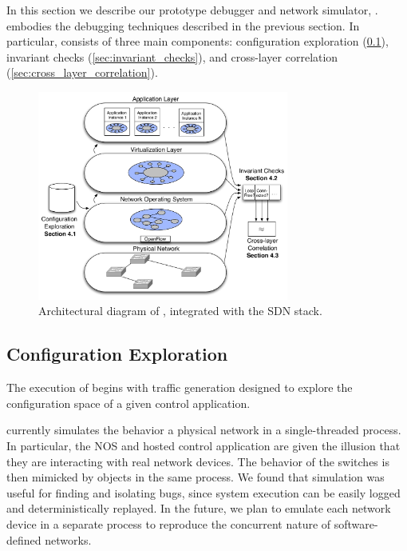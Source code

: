 
In this section we describe our prototype debugger and network simulator, \projectname{}.
\projectname{} embodies the debugging techniques described in the previous section.
In particular, \projectname{} consists of three main components: configuration exploration
(\ref{sec:configuration_exploration}), invariant checks
(\ref{sec:invariant_checks}), and cross-layer correlation
(\ref{sec:cross_layer_correlation}).


\begin{figure}[t]
    \hspace{-10pt}
    \includegraphics[width=3.25in]{../diagrams/architecture/Architecture_simplified.pdf}
    \caption[]{\label{fig:basicarch} Architectural diagram of \projectname{}, integrated with the SDN stack.} 
\end{figure}

\subsection{Configuration Exploration}
\label{sec:configuration_exploration}

The execution of \projectname{} begins with traffic generation designed to explore the configuration
space of a given control application. 

\projectname{} currently simulates the behavior a physical network in a single-threaded process.
In particular, the NOS and hosted control application are given the illusion that
they are interacting with real network devices. The behavior of the
switches is then mimicked by objects in the same process. We found that
simulation was useful for finding and isolating bugs, since system execution
can be easily logged and deterministically replayed. In the future, we plan to
emulate each network device in a separate process to reproduce the concurrent
nature of software-defined networks.

